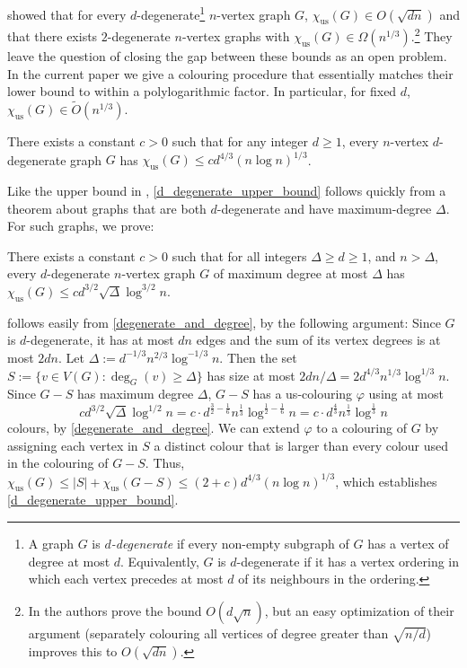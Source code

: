 \documentclass{patmorin}
\newcommand{\defin}[1]{\emph{\color{brightmaroon}#1}}
\newcommand{\trn}{\chi_{\mathrm{us}}}
\begin{document}
\citet{karpas.neiman.ea:on} showed that for every $d$-degenerate\footnote{A graph $G$ is \defin{$d$-degenerate} if every non-empty subgraph of $G$ has a vertex of degree at most $d$.  Equivalently, $G$ is $d$-degenerate if it has a vertex ordering in which each vertex precedes at most $d$ of its neighbours in the ordering.} $n$-vertex graph $G$, $\trn(G)\in O(\sqrt{dn})$ and that there exists $2$-degenerate $n$-vertex graphs with $\trn(G)\in\Omega(n^{1/3})$.\footnote{In \cite[Theorem~6.2]{karpas.neiman.ea:on} the authors prove the bound $O(d\sqrt{n})$, but an easy optimization of their argument (separately colouring all vertices of degree greater than $\sqrt{n/d}$) improves this to $O(\sqrt{dn})$.}  They leave the question of closing the gap between these bounds as an open problem. In the current paper we give a colouring procedure that essentially matches their lower bound to within a polylogarithmic factor.  In particular, for fixed $d$, $\trn(G)\in \tilde{O}(n^{1/3})$.

\begin{thm}\label{d_degenerate_upper_bound}
  There exists a constant $c>0$ such that for any integer $d\ge 1$, every $n$-vertex $d$-degenerate graph $G$ has $\trn(G) \le c d^{4/3}(n\log n)^{1/3}$.
\end{thm}

Like the upper bound in \cite{karpas.neiman.ea:on}, \cref{d_degenerate_upper_bound} follows quickly from a theorem about graphs that are both $d$-degenerate and have maximum-degree $\Delta$. For such graphs, we prove:

\begin{thm}\label{degenerate_and_degree}
  There exists a constant $c>0$ such that
  for all integers $\Delta\ge d \ge 1$, and $n> \Delta$, every $d$-degenerate $n$-vertex graph $G$ of maximum degree at most $\Delta$ has
  $\trn(G)\leq cd^{3/2}\sqrt{\Delta}\log^{3/2} n$.
\end{thm}

 follows easily from \cref{degenerate_and_degree}, by the following argument:  Since $G$ is $d$-degenerate, it has at most $dn$ edges and the sum of its vertex degrees is at most $2dn$.  Let $\Delta:=d^{-1/3}n^{2/3}\log^{-1/3} n$.  Then the set $S:=\{v\in V(G):\deg_G(v)\ge \Delta\}$ has size at most $2dn/\Delta=2d^{4/3}n^{1/3}\log^{1/3} n$.  Since $G-S$ has maximum degree $\Delta$, $G-S$ has a us-colouring $\varphi$ using at most
\[
  cd^{3/2}\sqrt{\Delta}\log^{1/2} n
  = c\cdot d^{\tfrac{3}{2}-\tfrac{1}{6}}n^{\tfrac{1}{3}}\log^{\tfrac{1}{2}-\tfrac{1}{6}} n
  = c\cdot d^{\tfrac{4}{3}}n^{\tfrac{1}{3}}\log^{\tfrac{1}{3}} n
\]
colours, by \cref{degenerate_and_degree}. We can extend $\varphi$ to a colouring of $G$ by assigning each vertex in $S$ a distinct colour that is larger than every colour used in the colouring of $G-S$.  Thus, $\trn(G)\le |S|+\trn(G-S)\le (2+c)d^{4/3}(n\log n)^{1/3}$, which establishes \cref{d_degenerate_upper_bound}.
\end{document}
